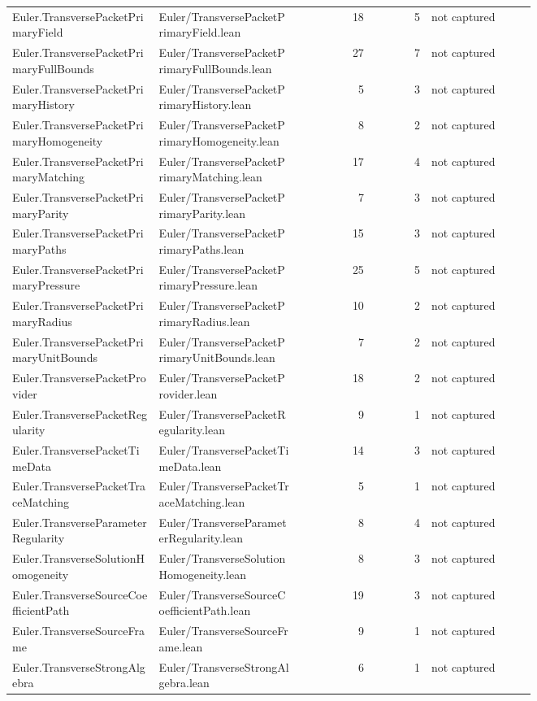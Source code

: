\documentclass[10pt]{article}
\begin{document}
\begin{longtable}{p{0.28\linewidth}p{0.27\linewidth}r r p{0.20\linewidth}}
Euler.TransversePacketPrimaryField & Euler/TransversePacketPrimaryField.lean & 18 & 5 & not captured\\
Euler.TransversePacketPrimaryFullBounds & Euler/TransversePacketPrimaryFullBounds.lean & 27 & 7 & not captured\\
Euler.TransversePacketPrimaryHistory & Euler/TransversePacketPrimaryHistory.lean & 5 & 3 & not captured\\
Euler.TransversePacketPrimaryHomogeneity & Euler/TransversePacketPrimaryHomogeneity.lean & 8 & 2 & not captured\\
Euler.TransversePacketPrimaryMatching & Euler/TransversePacketPrimaryMatching.lean & 17 & 4 & not captured\\
Euler.TransversePacketPrimaryParity & Euler/TransversePacketPrimaryParity.lean & 7 & 3 & not captured\\
Euler.TransversePacketPrimaryPaths & Euler/TransversePacketPrimaryPaths.lean & 15 & 3 & not captured\\
Euler.TransversePacketPrimaryPressure & Euler/TransversePacketPrimaryPressure.lean & 25 & 5 & not captured\\
Euler.TransversePacketPrimaryRadius & Euler/TransversePacketPrimaryRadius.lean & 10 & 2 & not captured\\
Euler.TransversePacketPrimaryUnitBounds & Euler/TransversePacketPrimaryUnitBounds.lean & 7 & 2 & not captured\\
Euler.TransversePacketProvider & Euler/TransversePacketProvider.lean & 18 & 2 & not captured\\
Euler.TransversePacketRegularity & Euler/TransversePacketRegularity.lean & 9 & 1 & not captured\\
Euler.TransversePacketTimeData & Euler/TransversePacketTimeData.lean & 14 & 3 & not captured\\
Euler.TransversePacketTraceMatching & Euler/TransversePacketTraceMatching.lean & 5 & 1 & not captured\\
Euler.TransverseParameterRegularity & Euler/TransverseParameterRegularity.lean & 8 & 4 & not captured\\
Euler.TransverseSolutionHomogeneity & Euler/TransverseSolutionHomogeneity.lean & 8 & 3 & not captured\\
Euler.TransverseSourceCoefficientPath & Euler/TransverseSourceCoefficientPath.lean & 19 & 3 & not captured\\
Euler.TransverseSourceFrame & Euler/TransverseSourceFrame.lean & 9 & 1 & not captured\\
Euler.TransverseStrongAlgebra & Euler/TransverseStrongAlgebra.lean & 6 & 1 & not captured\\

\end{longtable}
\end{document}
